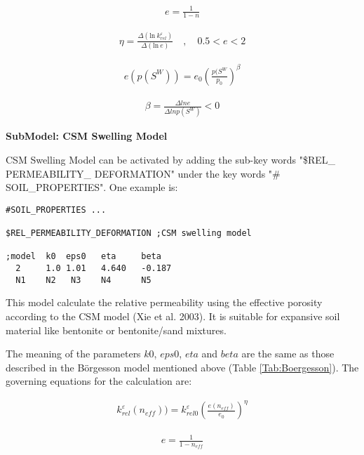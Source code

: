 \begin{eqnarray}
e=\frac{1}{1-n} \label{eqn:voidRatio}
\end{eqnarray}

\begin{eqnarray}
\eta = \frac {\Delta(\mathrm{ln~}{k^\varepsilon_{rel}})}
{\Delta(\mathrm{ln~} e)} \quad , \quad 0.5 < e < 2 \label{eqn:eta}
\end{eqnarray}

\begin{eqnarray}
e(p(S^W))=e_0 \left( \frac{p(S^W}{p_0}\right)^\beta
\label{eqn:SwellPress}
\end{eqnarray}

\begin{eqnarray}
\beta = \frac{\Delta ln e}{\Delta ln p(S^W)}<0 \label{eqn:beta}
\end{eqnarray}


\textbf{SubModel: CSM Swelling Model}

\vspace{0.5cm}

CSM Swelling Model can be activated by adding the sub-key words
"\$REL\_ PERMEABILITY\_ DEFORMATION" under the key words "\#
SOIL\_PROPERTIES". One example is:

\footnotesize

\begin{verbatim}
#SOIL_PROPERTIES ...

$REL_PERMEABILITY_DEFORMATION ;CSM swelling model

;model  k0  eps0   eta     beta
  2     1.0 1.01   4.640   -0.187
  N1    N2   N3    N4      N5
\end{verbatim}

This model calculate the relative permeability using the effective
porosity according to the CSM model (Xie et al. 2003). It is
suitable for expansive soil material like bentonite or
bentonite/sand mixtures.

The meaning of the parameters $k0$, $eps0$, $eta$ and $beta$ are
the same as those described in the B\"{o}rgesson model mentioned above
(Table \ref{Tab:Boergesson}). The governing equations for the
calculation are:

\begin{eqnarray}
k^\varepsilon_{rel}(n_{eff})) =
k^\varepsilon_{rel0}\left(\frac{e(n_{eff})}{e_0}\right)^\eta
\label{eqn:relPerCSM}
\end{eqnarray}

\begin{eqnarray}
e=\frac{1}{1-n_{eff}} \label{eqn:voidRatioCSM}
\end{eqnarray}

